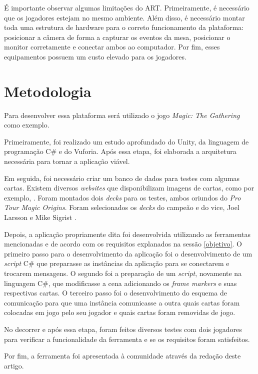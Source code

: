 \documentclass[conference]{IEEEtran}
\begin{document}
É importante observar algumas limitações do ART. Primeiramente, é necessário 
que os jogadores estejam no mesmo ambiente. Além disso, é necessário montar 
toda uma estrutura de hardware para o correto funcionamento da plataforma: 
posicionar a câmera de forma a capturar os eventos da mesa, posicionar o monitor 
corretamente e conectar ambos ao computador. Por fim, esses equipamentos 
possuem um custo elevado para os jogadores.

\section{Metodologia}
\label{metodologia}
Para desenvolver essa plataforma será utilizado o jogo \textit{Magic: The 
Gathering} como exemplo. 

Primeiramente, foi realizado um estudo aprofundado do Unity, da linguagem de 
programação C\# \cite{csharp} e do Vuforia. Após essa etapa, foi elaborada a 
arquitetura necessária para tornar a aplicação viável.

Em seguida, foi necessário criar um banco de dados para testes com algumas 
cartas. Existem diversos \textit{websites} que disponibilizam imagens de cartas, 
como por exemplo, \cite{magic_cards}. Foram montados dois \textit{decks} para 
os testes, ambos oriundos do \textit{Pro Tour Magic Origins}. Foram 
selecionados os \textit{decks} do campeão e do vice, Joel Larsson e Mike Sigrist 
\cite{protour}.

Depois, a aplicação propriamente dita foi desenvolvida utilizando as ferramentas 
mencionadas e de acordo com os requisitos explanados na sessão \ref{objetivo}.
O primeiro passo para o desenvolvimento da aplicação foi o desenvolvimento de 
um \textit{script} C\# que preparasse as instâncias da aplicação para se 
conectarem e trocarem mensagens. O segundo foi a preparação de um 
\textit{script}, novamente na linguagem C\#, que modificasse a cena adicionando 
os \textit{frame markers} e suas respectivas cartas. O terceiro passo foi o 
desenvolvimento do esquema de comunicação para que uma instância comunicasse a 
outra quais cartas foram colocadas em jogo pelo seu jogador e quais cartas foram 
removidas de jogo.

No decorrer e após essa etapa, foram feitos diversos testes com dois jogadores 
para verificar a funcionalidade da ferramenta e se os requisitos foram 
satisfeitos.

Por fim, a ferramenta foi apresentada à comunidade através da redação deste 
artigo.
\end{document}
